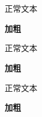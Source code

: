 
\pagestyle{artimain}

\section{}

	\subsection{}
	
		\subsubsection{}
		
			正常文本
			\par \textbf{加粗}
			\par {\heiti 正常文本}
			\par {\heiti \textbf{加粗}}
			\par {\kaishu 正常文本}
			\par {\kaishu \textbf{加粗}}